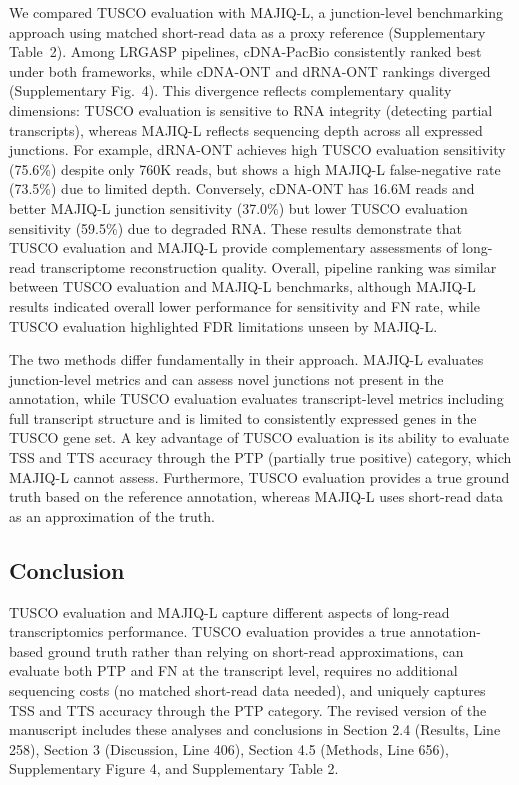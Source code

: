 \documentclass[11pt]{article}
\begin{document}
\begin{responseboxnew}
We compared TUSCO evaluation with MAJIQ-L, a junction-level benchmarking approach using matched short-read data as a proxy reference (Supplementary Table~2). Among LRGASP pipelines, cDNA-PacBio consistently ranked best under both frameworks, while cDNA-ONT and dRNA-ONT rankings diverged (Supplementary Fig.~4). This divergence reflects complementary quality dimensions: TUSCO evaluation is sensitive to RNA integrity (detecting partial transcripts), whereas MAJIQ-L reflects sequencing depth across all expressed junctions. For example, dRNA-ONT achieves high TUSCO evaluation sensitivity (75.6\%) despite only 760K reads, but shows a high MAJIQ-L false-negative rate (73.5\%) due to limited depth. Conversely, cDNA-ONT has 16.6M reads and better MAJIQ-L junction sensitivity (37.0\%) but lower TUSCO evaluation sensitivity (59.5\%) due to degraded RNA. These results demonstrate that TUSCO evaluation and MAJIQ-L provide complementary assessments of long-read transcriptome reconstruction quality. Overall, pipeline ranking was similar between TUSCO evaluation and MAJIQ-L benchmarks, although MAJIQ-L results indicated overall lower performance for sensitivity and FN rate, while TUSCO evaluation highlighted FDR limitations unseen by MAJIQ-L.

The two methods differ fundamentally in their approach. MAJIQ-L evaluates junction-level metrics and can assess novel junctions not present in the annotation, while TUSCO evaluation evaluates transcript-level metrics including full transcript structure and is limited to consistently expressed genes in the TUSCO gene set. A key advantage of TUSCO evaluation is its ability to evaluate TSS and TTS accuracy through the PTP (partially true positive) category, which MAJIQ-L cannot assess. Furthermore, TUSCO evaluation provides a true ground truth based on the reference annotation, whereas MAJIQ-L uses short-read data as an approximation of the truth.

\subsection*{Conclusion}

TUSCO evaluation and MAJIQ-L capture different aspects of long-read transcriptomics performance. TUSCO evaluation provides a true annotation-based ground truth rather than relying on short-read approximations, can evaluate both PTP and FN at the transcript level, requires no additional sequencing costs (no matched short-read data needed), and uniquely captures TSS and TTS accuracy through the PTP category. The revised version of the manuscript includes these analyses and conclusions in Section 2.4 (Results, Line 258), Section 3 (Discussion, Line 406), Section 4.5 (Methods, Line 656), Supplementary Figure 4, and Supplementary Table 2.

\end{responseboxnew}
\end{document}
